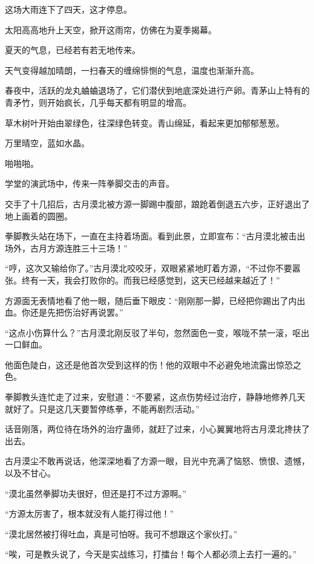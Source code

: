 
\begin{this_body}

这场大雨连下了四天，这才停息。

太阳高高地升上天空，掀开这雨帘，仿佛在为夏季揭幕。

夏天的气息，已经若有若无地传来。

天气变得越加晴朗，一扫春天的缠绵悱恻的气息，温度也渐渐升高。

春夜中，活跃的龙丸蛐蛐退场了，它们潜伏到地底深处进行产卵。青茅山上特有的青矛竹，则开始疯长，几乎每天都有明显的增高。

草木树叶开始由翠绿色，往深绿色转变。青山绵延，看起来更加郁郁葱葱。

万里晴空，蓝如水晶。

啪啪啪。

学堂的演武场中，传来一阵拳脚交击的声音。

交手了十几招后，古月漠北被方源一脚踢中腹部，踉跄着倒退五六步，正好退出了地上画着的圆圈。

拳脚教头站在场下，一直在主持着场面。看到此景，立即宣布：“古月漠北被击出场外，古月方源连胜三十三场！”

“哼，这次又输给你了。”古月漠北咬咬牙，双眼紧紧地盯着方源，“不过你不要嚣张。终有一天，我会打败你的。而我已经感觉到，这天已经越来越近了！”

方源面无表情地看了他一眼，随后垂下眼皮：“刚刚那一脚，已经把你踢出了内出血。你还是先把伤治好再说罢。”

“这点小伤算什么？”古月漠北刚反驳了半句，忽然面色一变，喉咙不禁一滚，呕出一口鲜血。

他面色陡白，这还是他首次受到这样的伤！他的双眼中不必避免地流露出惊恐之色。

拳脚教头连忙走了过来，安慰道：“不要紧，这点伤势经过治疗，静静地修养几天就好了。只是这几天要暂停练拳，不能再剧烈活动。”

话音刚落，两位待在场外的治疗蛊师，就赶了过来，小心翼翼地将古月漠北搀扶了出去。

古月漠尘不敢再说话，他深深地看了方源一眼，目光中充满了恼怒、愤恨、遗憾，以及不甘心。

“漠北虽然拳脚功夫很好，但还是打不过方源啊。”

“方源太厉害了，根本就没有人能打得过他！”

“漠北居然被打得吐血，真是可怕呀。我可不想跟这个家伙打。”

“唉，可是教头说了，今天是实战练习，打擂台！每个人都必须上去打一遍的。”


\end{this_body}
